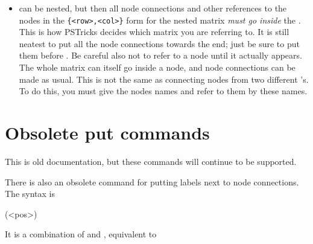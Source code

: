 \documentclass[fontsize=11pt,english,BCOR=10mm,DIV=12,bibliography=totoc,parskip=false,headings=small,
    headinclude=false,footinclude=false,oneside]{pst-doc}
\begin{document}
\begin{itemize}
\begin{BDef}
\end{BDef}

 \emph{at the end of the entry}. This is like Plain \TeX's , or
 \LaTeX's , but the template for the current column (the first
  column that is spanned) is still used. If you want wipe out the template as
  well, use  \emph{at the beginning of the entry} instead.
  If you just want to wipe out the template, use  before the entry.

  \item {} can be nested, but then all node connections and other
  references to the nodes in the \verb|{<row>,<col>}| form for the nested matrix
  \emph{must go inside} the . This is how  PSTricks decides which
  matrix you are referring to. It is still neatest to put all the node
  connections towards the end; just be sure to put them before .
  Be careful also not to refer to a node until it actually appears. The whole
  matrix can itself go inside a node, and node connections can be made as
  usual. This is not the same as connecting nodes from two different
  's. To do this, you must give the nodes names and refer to them
  by these names.

\end{itemize}

\section{Obsolete put commands}

This is old documentation, but these commands will continue to be supported.

There is also an obsolete command  for putting labels
next to node connections. The syntax is

\begin{BDef}
  \Largr(<pos>)
\end{BDef}

It is a combination of  and , equivalent to

\begin{BDef}
\end{BDef}
\end{document}
